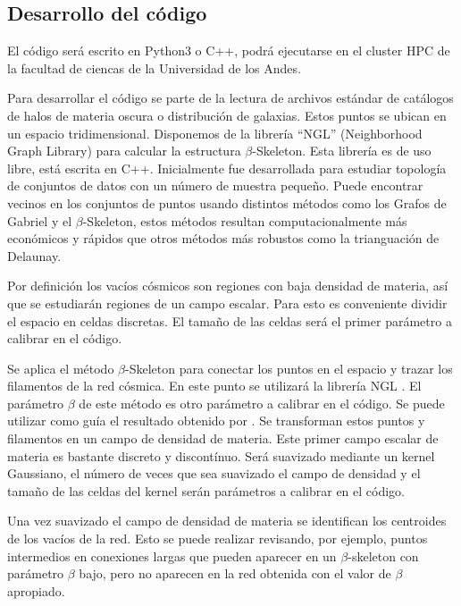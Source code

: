 \documentclass[preprint]{aastex62}
\begin{document}
  \subsection{Desarrollo del código}

  El código será escrito en Python3 o C++, podrá ejecutarse en el
  cluster HPC de la facultad de ciencas de la Universidad de los Andes.
  
  Para desarrollar el código se parte de la lectura de archivos estándar de catálogos de halos
  de materia oscura o distribución de galaxias. Estos puntos se ubican en un espacio tridimensional.
  Disponemos de la librería ``NGL''\citep{ngl} (Neighborhood Graph Library)
  para calcular la estructura $\beta$-Skeleton. Esta librería es de uso libre, está escrita en C++.
  Inicialmente fue desarrollada para estudiar topología de conjuntos de datos con un número de muestra
  pequeño. Puede encontrar vecinos en los conjuntos de puntos usando distintos métodos como los
  Grafos de Gabriel y el $\beta$-Skeleton, estos métodos resultan computacionalmente más económicos
  y rápidos que otros métodos más robustos como la trianguación de Delaunay.
  
  Por definición los vacíos cósmicos son regiones con baja densidad de materia, así que se
  estudiarán regiones de un campo escalar. Para esto es conveniente dividir el espacio en
  celdas discretas. El tamaño de las celdas será el primer parámetro a calibrar en el código.
  
  Se aplica el método $\beta$-Skeleton para conectar los puntos en el espacio y trazar los
  filamentos de la red cósmica. En este punto se utilizará la librería NGL \citep{ngl}.
  El parámetro $\beta$ de este método es otro parámetro a calibrar en el código. Se puede
  utilizar como guía el resultado obtenido por \citet{Fang2018}.
  Se transforman estos puntos y filamentos en un campo de densidad de materia. Este primer
  campo escalar de materia es bastante discreto y discontínuo. Será suavizado mediante un
  kernel Gaussiano, el número de veces que sea suavizado el campo de densidad y el tamaño de
  las celdas del kernel serán parámetros a calibrar en el código.

  Una vez suavizado el campo de densidad de materia se identifican los centroides
  de los vacíos de la red. Esto se puede realizar revisando, por ejemplo, puntos intermedios
  en conexiones largas que pueden aparecer en un $\beta$-skeleton con parámetro $\beta$ bajo,
  pero no aparecen en la red obtenida con el valor de $\beta$ apropiado.
\end{document}
